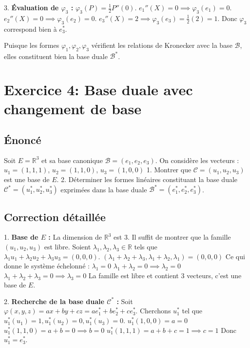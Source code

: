 \documentclass{report}
\begin{document}
3. \textbf{Évaluation de $\varphi_3$ :}
   $\varphi_3(P) = \frac{1}{2}P''(0)$.
   $e_1''(X) = 0 \implies \varphi_3(e_1) = 0$.
   $e_2''(X) = 0 \implies \varphi_3(e_2) = 0$.
   $e_3''(X) = 2 \implies \varphi_3(e_3) = \frac{1}{2}(2) = 1$.
   Donc $\varphi_3$ correspond bien à $e_3^*$.

Puisque les formes $\varphi_1, \varphi_2, \varphi_3$ vérifient les relations de Kronecker avec la base $\mathcal{B}$, elles constituent bien la base duale $\mathcal{B}^*$.


\newpage
\chapter*{Exercice 4: Base duale avec changement de base}
\section*{Énoncé}
Soit $E = \mathbb{R}^3$ et sa base canonique $\mathcal{B} = (e_1, e_2, e_3)$. On considère les vecteurs :
$u_1 = (1, 1, 1)$, $u_2 = (1, 1, 0)$, $u_3 = (1, 0, 0)$
1. Montrer que $\mathcal{C} = (u_1, u_2, u_3)$ est une base de $E$.
2. Déterminer les formes linéaires constituant la base duale $\mathcal{C}^* = (u_1^*, u_2^*, u_3^*)$ exprimées dans la base duale $\mathcal{B}^* = (e_1^*, e_2^*, e_3^*)$.


\section*{Correction détaillée}
1. \textbf{Base de $E$ :}
   La dimension de $\mathbb{R}^3$ est 3. Il suffit de montrer que la famille $(u_1, u_2, u_3)$ est libre.
   Soient $\lambda_1, \lambda_2, \lambda_3 \in \mathbb{R}$ tels que $\lambda_1 u_1 + \lambda_2 u_2 + \lambda_3 u_3 = (0, 0, 0)$.
   $(\lambda_1 + \lambda_2 + \lambda_3, \lambda_1 + \lambda_2, \lambda_1) = (0, 0, 0)$
   Ce qui donne le système échelonné :
   $\lambda_1 = 0$
   $\lambda_1 + \lambda_2 = 0 \implies \lambda_2 = 0$
   $\lambda_1 + \lambda_2 + \lambda_3 = 0 \implies \lambda_3 = 0$
   La famille est libre et contient 3 vecteurs, c'est une base de $E$.

2. \textbf{Recherche de la base duale $\mathcal{C}^*$ :}
   Soit $\varphi(x, y, z) = ax + by + cz = a e_1^* + b e_2^* + c e_3^*$.
   Cherchons $u_1^*$ tel que $u_1^*(u_1)=1, u_1^*(u_2)=0, u_1^*(u_3)=0$.
   $u_1^*(1,0,0) = a = 0$
   $u_1^*(1,1,0) = a + b = 0 \implies b = 0$
   $u_1^*(1,1,1) = a + b + c = 1 \implies c = 1$
   Donc $u_1^* = e_3^*$.
\end{document}
